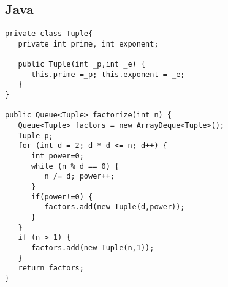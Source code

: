 \subsection{Java}
\begin{lstlisting}
private class Tuple{
   private int prime, int exponent;
	
   public Tuple(int _p,int _e) {
      this.prime =_p; this.exponent = _e;
   }
}

public Queue<Tuple> factorize(int n) {
   Queue<Tuple> factors = new ArrayDeque<Tuple>();
   Tuple p;
   for (int d = 2; d * d <= n; d++) {
      int power=0;
      while (n % d == 0) {
         n /= d; power++;
      }
      if(power!=0) {
         factors.add(new Tuple(d,power));
      }
   }
   if (n > 1) {
      factors.add(new Tuple(n,1));
   }
   return factors;
}
\end{lstlisting}
